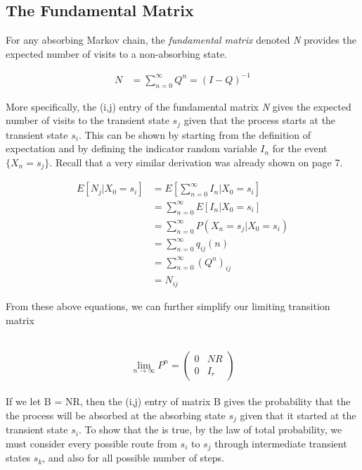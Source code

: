 \documentclass[a4paper, 12pt]{article}
\begin{document}
	\subsection*{The Fundamental Matrix}
	
For any absorbing Markov chain, the \textit{fundamental matrix} denoted \textit{N} provides the expected number of visits to a non-absorbing state. 

	\begin{equation*}
	\begin{aligned}
	 	N &= \sum_{n=0}^\infty Q^n = (I-Q)^{-1}
	\end{aligned}
	\end{equation*}	
	
More specifically, the (i,j) entry of the fundamental matrix \textit{N} gives the expected number of visits to the transient state $s_j$ given that the process starts at the transient state $s_i$. This can be shown by starting from the definition of expectation and by defining the indicator random variable $I_n$ for the event $\{X_n = s_j\}$. Recall that a very similar derivation was already shown on page 7.

	\begin{equation*}
	\begin{aligned}
		 E[N_j|X_0 = s_i] &= E\left[\sum_{n=0}^\infty I_n | X_0 = s_i\right] \\
		 				  &= \sum_{n=0}^\infty E\left[I_n | X_0 = s_i\right] \\
		 				  &= \sum_{n=0}^\infty P(X_n = s_j | X_0 = s_i) \\
		 				  &= \sum_{n=0}^\infty q_{ij}(n) \\
		 				  &= \sum_{n=0}^\infty (Q^n)_{ij} \\
		 				  &= N_{ij}
	\end{aligned}
	\end{equation*}

From these above equations, we can further simplify our limiting transition matrix

\\
  	 \[
    \lim_{n\to\infty}P^n = \left(
    \begin{array}{c|c}
      0 & NR \\
      \hline
      0 & I_r
    \end{array}
    \right)
  \]
\\

If we let B = NR, then the (i,j) entry of matrix B gives the probability that the the process will be absorbed at the absorbing state $s_j$ given that it started at the transient state $s_i$. To show that the is true, by the law of total probability, we must consider every possible route from $s_i$ to $s_j$ through intermediate transient states $s_k$, and also for all possible number of steps.
\end{document}
